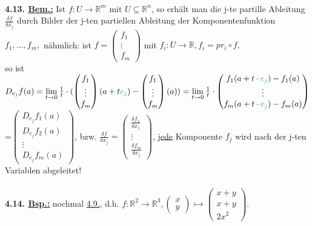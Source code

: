 \documentclass[]{scrartcl}
\begin{document}
\\
\textbf{4.13. \underline{Bem.:}} Ist $f: U\rightarrow \mathbb{R}^m$ mit 
$U\subseteq \mathbb{R}^n$, so erhält man die j-te partille Ableitung 
$\frac{\delta f}{\delta x_j}$ durch Bilder der j-ten partiellen Ableitung der 
Komponentenfunktion $f_1,...,f_m,$ nähmlich: ist $f=\begin{pmatrix}
	f_1\\\vdots\\f_m
\end{pmatrix}$ mit $f_i : U\rightarrow\mathbb{R}, f_i=pr_i \circ f,$\\
so ist $D_{e_j} f(a)=\lim\limits_{t\rightarrow 
0}\frac{1}{t}\cdot(\begin{pmatrix}
	f_1\\\vdots\\f_m
\end{pmatrix}(a+t\textcolor{cyan}{e_j})-\begin{pmatrix}
	f_1\\\vdots\\f_m
\end{pmatrix}(a))=\lim\limits_{t\rightarrow0}\frac{1}{t}\cdot\begin{pmatrix}
	f_1(a+t\cdot\textcolor{cyan}{e_j})-f_1(a)\\\vdots\\f_m(a+t\cdot\textcolor{cyan}{e_j})-f_m(a)
\end{pmatrix}$\\
=$\begin{pmatrix}
	D_{e_j}f_1(a)\\D_{e_j}f_2(a)\\\vdots\\D_{e_j}f_m(a)
\end{pmatrix}$, bzw. $\frac{\delta f}{\delta x_j}=\begin{pmatrix}
	\frac{\delta f_1}{\delta x_j}\\\vdots\\\frac{\delta f_m}{\delta x_j}
\end{pmatrix}$, \underline{jede} Komponente $f_j$ wird nach der j-ten Variablen 
abgeleitet!\\
\\
\textbf{4.14. \underline{Bsp.:}} nochmal  \ul{4.9.}, d.h. 
$f:\mathbb{R}^2\rightarrow\mathbb{R}^3, \begin{pmatrix}
	x\\y
\end{pmatrix}\rightarrowtail\begin{pmatrix}
	x+y\\x+y\\2x^2
\end{pmatrix}.$\\
\end{document}
